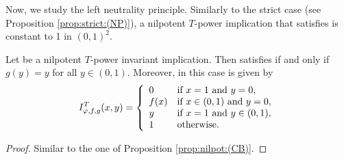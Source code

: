 
Now, we study the left neutrality principle. Similarly to the strict case (see Proposition \ref{prop:strict:(NP)}), a nilpotent $T$-power implication that satisfies \NP is constant to 1 in $(0,1)^2$.

\begin{proposition}\label{prop:nilpotent:(NP)}
	Let \IT be a nilpotent $T$-power invariant implication. Then \IT satisfies \NP if and only if $g(y)=y$ for all $y \in (0,1)$. Moreover, in this case \IT is given by
	\begin{equation}\label{eq:nilpot:(NP)}
		I^T_{\varphi,f,g}(x,y) =\left\{ \begin{array}{ll}
			0 &   \text{if }   x=1 \text{ and } y=0, \\
			f(x) &  \text{if }  x \in (0,1) \text{ and } y=0, \\
			y &  \text{if } x=1 \text{ and } y \in (0,1), \\
			1 & \text{otherwise.}
		\end{array}
		\right.
	\end{equation}
\end{proposition}
\begin{proof}
	Similar to the one of Proposition \ref{prop:nilpot:(CB)}.
\end{proof}

